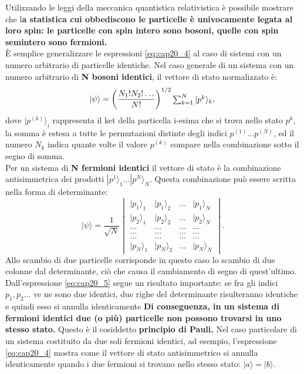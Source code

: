Utilizzando le leggi della meccanica quantistica relativistica è possibile mostrare che l\textbf{a statistica cui obbediscono le particelle è univocamente legata al loro spin: le particelle con spin intero sono bosoni, quelle con spin semintero sono fermioni.}\\
È semplice generalizzare le espressioni \ref{eq:cap20_4} al caso di sistemi con un numero arbitrario di particelle identiche. Nel caso generale di un sistema con un numero arbitrario di \textbf{N bosoni identici}, il vettore di stato normalizzato è:\\
\begin{equation}
|\psi\rangle= \left(\frac{N_{1}! N_{2}!\dots}{N!}\right)^{1/2} \begin{matrix} \sum_{k=1}^N |p^k\rangle_{k} \end{matrix}, \\
\end{equation}
dove $|p^{(k)}\rangle_i$ rappresenta il ket della particella i-esima che si trova nello stato $p^k$, la somma \`e estesa a tutte le permutazioni distinte degli indici $p^{(1)}...p^{(N)}$, ed il numero $N_{k}$ indica quante volte il valore $p^{(k)}$ compare nella combinazione sotto il segno di somma.\\
Per un sistema di \textbf{N fermioni identici} il vettore di stato \`e la combinazione antisimmetrica dei prodotti $|p^1\rangle_1...|p^N\rangle_N$. Questa combinazione pu\`o essere scritta nella forma di determinante:\\
\begin{equation}
|\psi\rangle= \frac{1}{\sqrt{N}} \begin{vmatrix} |p_{1}\rangle_1 & |p_{1}\rangle_2 & ... & |p_{1}\rangle_N \\|p_{2}\rangle_1 & |p_{2}\rangle_2 & ... & |p_{2}\rangle_N \\ ... & ... & ... & ... \\ ... & ... & ... & ... \\ ... & ... & ... & ... \\|p_{N}\rangle_1 & |p_{N}\rangle_2 & ... & |p_{N}\rangle_N\end{vmatrix}.
\label{eq:cap20_5}
\end{equation}
Allo scambio di due particelle corrisponde in questo caso lo scambio di due colonne dal determinante, ciò che causa il cambiamento di segno di quest'ultimo.\\
Dall'espressione \ref{eq:cap20_5} segue un risultato importante: se fra gli indici $p_1, p_2...$ ve ne sono due identici, due righe del determinante risulteranno identiche e quindi esso si annulla identicamente \textbf{Di conseguenza, in un sistema di fermioni identici due (o pi\`u) particelle non possono trovarsi in uno stesso stato.} Questo è il cosiddetto \textbf{principio di Pauli.} Nel caso particolare di un sistema costituito da due soli fermioni identici, ad esempio, l'espressione \ref{eq:cap20_4} mostra come il vettore di stato antisimmetrico si annulla identicamente quando i due fermioni si trovano nello stesso stato: $|a\rangle= |b\rangle$.\\
